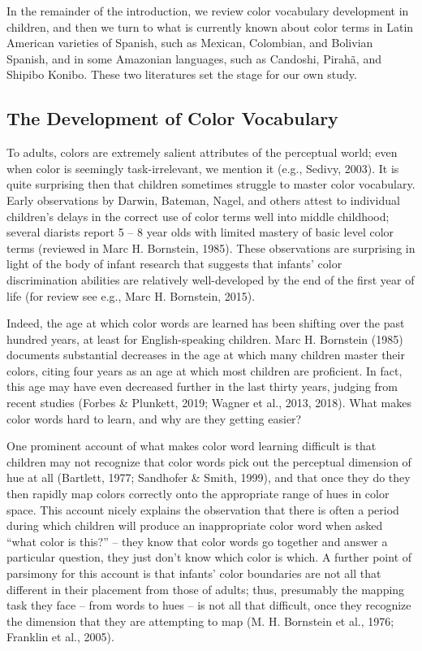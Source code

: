 \documentclass[
  english,
  ,apa7,floatsintext]{apa6}
\begin{document}
In the remainder of the introduction, we review color vocabulary development in children, and then we turn to what is currently known about color terms in Latin American varieties of Spanish, such as Mexican, Colombian, and Bolivian Spanish, and in some Amazonian languages, such as Candoshi, Pirahã, and Shipibo Konibo. These two literatures set the stage for our own study.

\hypertarget{the-development-of-color-vocabulary}{%
\subsection{The Development of Color Vocabulary}\label{the-development-of-color-vocabulary}}

To adults, colors are extremely salient attributes of the perceptual world; even when color is seemingly task-irrelevant, we mention it (e.g., Sedivy, 2003). It is quite surprising then that children sometimes struggle to master color vocabulary. Early observations by Darwin, Bateman, Nagel, and others attest to individual children's delays in the correct use of color terms well into middle childhood; several diarists report 5 -- 8 year olds with limited mastery of basic level color terms (reviewed in Marc H. Bornstein, 1985). These observations are surprising in light of the body of infant research that suggests that infants' color discrimination abilities are relatively well-developed by the end of the first year of life (for review see e.g., Marc H. Bornstein, 2015).

Indeed, the age at which color words are learned has been shifting over the past hundred years, at least for English-speaking children. Marc H. Bornstein (1985) documents substantial decreases in the age at which many children master their colors, citing four years as an age at which most children are proficient. In fact, this age may have even decreased further in the last thirty years, judging from recent studies (Forbes \& Plunkett, 2019; Wagner et al., 2013, 2018). What makes color words hard to learn, and why are they getting easier?

One prominent account of what makes color word learning difficult is that children may not recognize that color words pick out the perceptual dimension of hue at all (Bartlett, 1977; Sandhofer \& Smith, 1999), and that once they do they then rapidly map colors correctly onto the appropriate range of hues in color space. This account nicely explains the observation that there is often a period during which children will produce an inappropriate color word when asked ``what color is this?'' -- they know that color words go together and answer a particular question, they just don't know which color is which. A further point of parsimony for this account is that infants' color boundaries are not all that different in their placement from those of adults; thus, presumably the mapping task they face -- from words to hues -- is not all that difficult, once they recognize the dimension that they are attempting to map (M. H. Bornstein et al., 1976; Franklin et al., 2005).
\end{document}
